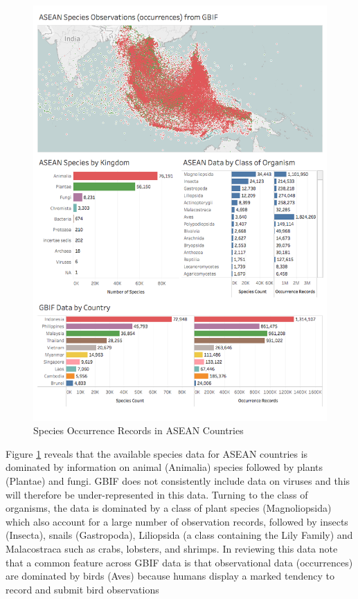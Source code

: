 \documentclass[]{book}
\theoremstyle{definition}
\theoremstyle{definition}
\theoremstyle{definition}
\theoremstyle{remark}
\begin{document}
\begin{figure}

{\centering \includegraphics[width=1\linewidth]{images/asean_biodiversity} 

}

\caption{Species Occurrence Records in ASEAN Countries}\label{fig:biodiv}
\end{figure}

Figure \ref{fig:biodiv} reveals that the available species data for
ASEAN countries is dominated by information on animal (Animalia) species
followed by plants (Plantae) and fungi. GBIF does not consistently
include data on viruses and this will therefore be under-represented in
this data. Turning to the class of organisms, the data is dominated by a
class of plant species (Magnoliopsida) which also account for a large
number of observation records, followed by insects (Insecta), snails
(Gastropoda), Liliopsida (a class containing the Lily Family) and
Malacostraca such as crabs, lobsters, and shrimps. In reviewing this
data note that a common feature across GBIF data is that observational
data (occurrences) are dominated by birds (Aves) because humans display
a marked tendency to record and submit bird observations
\end{document}
